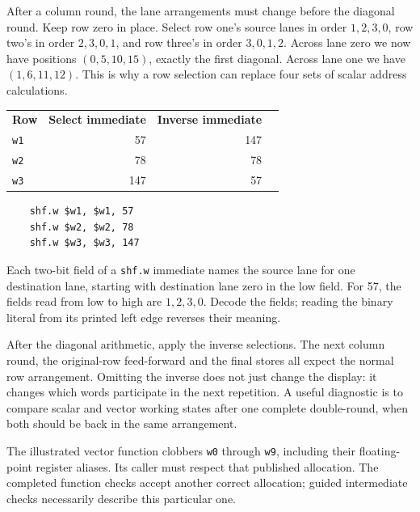 After a column round, the lane arrangements must change before the diagonal
round. Keep row zero in place. Select row one's source lanes in order
$1,2,3,0$, row two's in order $2,3,0,1$, and row three's in order $3,0,1,2$.
Across lane zero we now have positions $(0,5,10,15)$, exactly the first diagonal.
Across lane one we have $(1,6,11,12)$. This is why a row selection can replace
four sets of scalar address calculations.

\begin{center}
  \begin{tabular}{lrrr}
    \textbf{Row} & \textbf{Select immediate} & \textbf{Inverse immediate} \\
    \texttt{w1}  & 57                        & 147                        \\
    \texttt{w2}  & 78                        & 78                         \\
    \texttt{w3}  & 147                       & 57
  \end{tabular}
\end{center}

\begin{verbatim}
    shf.w $w1, $w1, 57
    shf.w $w2, $w2, 78
    shf.w $w3, $w3, 147
\end{verbatim}

Each two-bit field of a \texttt{shf.w} immediate names the source lane for one
destination lane, starting with destination lane zero in the low field.
For 57, the fields read from low to high are $1,2,3,0$. Decode the fields;
reading the binary literal from its printed left edge reverses their meaning.

After the diagonal arithmetic, apply the inverse selections. The next column
round, the original-row feed-forward and the final stores all expect the normal
row arrangement. Omitting the inverse does not just change the display: it
changes which words participate in the next repetition. A useful diagnostic is
to compare scalar and vector working states after one complete double-round,
when both should be back in the same arrangement.

The illustrated vector function clobbers \texttt{w0} through \texttt{w9},
including their floating-point register aliases. Its caller must respect that
published allocation. The completed function checks accept another correct
allocation; guided intermediate checks necessarily describe this particular one.

